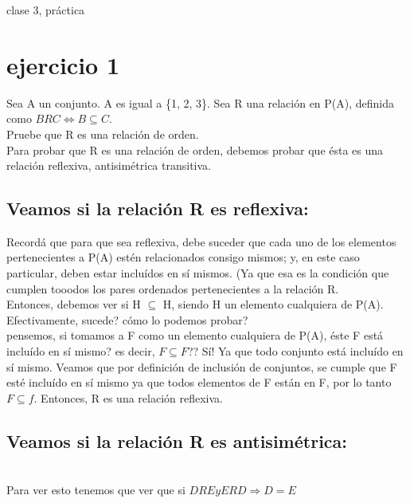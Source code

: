\documentclass{article}
\begin{document}
clase 3, práctica

\section{ejercicio 1}

Sea A un conjunto. A es igual a \{1, 2, 3\}. Sea R una relación en P(A), definida como $ BRC \Leftrightarrow B \subseteq C$.\\


Pruebe que R es una relación de orden.\\

Para probar que R es una relación de orden, debemos probar que ésta es una relación reflexiva, antisimétrica  transitiva.\\

\subsection{Veamos si la relación R es reflexiva:}

Recordá que para que sea reflexiva, debe suceder que cada uno de los elementos pertenecientes a P(A) estén relacionados consigo mismos; y, en este caso particular, deben estar incluídos en sí mismos. (Ya que esa es la condición que cumplen tooodos los pares ordenados pertenecientes a la relación R.\\

Entonces, debemos ver si H $\subseteq$ H, siendo H un elemento cualquiera de P(A).\\

Efectivamente, sucede? cómo lo podemos probar?\\

pensemos, si tomamos a F como un elemento cualquiera de P(A), éste F está incluído en sí mismo? es decir, $F \subseteq F$?? Sí! Ya que todo conjunto está incluído en sí mismo. Veamos que por definición de inclusión de conjuntos, se cumple que F esté incluído en sí mismo ya que todos elementos de F están en F, por lo tanto $F \subseteq f$. Entonces, R es una relación reflexiva. \\

\subsection{Veamos si la relación R es antisimétrica:}\\

Para ver esto tenemos que ver que si $DRE y ERD \Rightarrow D = E$\\
\end{document}
